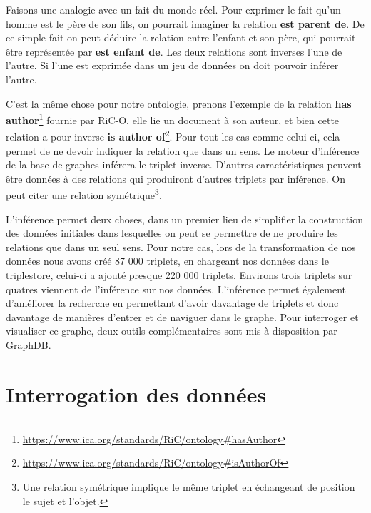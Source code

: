 Faisons une analogie avec un fait du monde réel. Pour exprimer le fait qu'un homme est le père de son fils, on pourrait imaginer la relation \textbf{est parent de}. De ce simple fait on peut déduire la relation entre l'enfant et son père, qui pourrait être représentée par \textbf{est enfant de}. Les deux relations sont inverses l'une de l'autre. Si l'une est exprimée dans un jeu de données on doit pouvoir inférer l'autre.
\par
C'est la même chose pour notre ontologie, prenons l'exemple de la relation \textbf{has author}\footnote{\href{https://www.ica.org/standards/RiC/ontology\#hasAuthor}{https://www.ica.org/standards/RiC/ontology\#hasAuthor}} fournie par RiC-O, elle lie un document à son auteur, et bien cette relation a pour inverse \textbf{is author of}\footnote{\href{https://www.ica.org/standards/RiC/ontology\#isAuthorOf}{https://www.ica.org/standards/RiC/ontology\#isAuthorOf}}. Pour tout les cas comme celui-ci, cela permet de ne devoir indiquer la relation que dans un sens. Le moteur d'inférence de la base de graphes inférera le triplet inverse. D'autres caractéristiques peuvent être données à des relations qui produiront d'autres triplets par inférence. On peut citer une relation symétrique\footnote{Une relation symétrique implique le même triplet en échangeant de position le sujet et l'objet.}.
\par
L'inférence permet deux choses, dans un premier lieu de simplifier la construction des données initiales dans lesquelles on peut se permettre de ne produire les relations que dans un seul sens. Pour notre cas, lors de la transformation de nos données nous avons créé 87 000 triplets, en chargeant nos données dans le triplestore, celui-ci a ajouté presque 220 000 triplets. Environs trois triplets sur quatres viennent de l'inférence sur nos données.  L'inférence permet également d'améliorer la recherche en permettant d'avoir davantage de triplets et donc davantage de manières d'entrer et de naviguer dans le graphe. Pour interroger et visualiser ce graphe, deux outils complémentaires sont mis à disposition par GraphDB.
\section{Interrogation des données}
